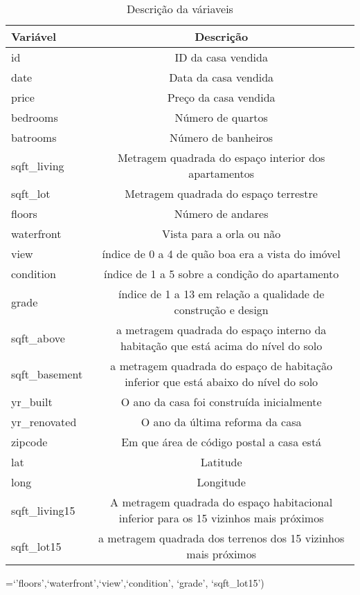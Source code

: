 \documentclass[
]{article}
\begin{document}
\begin{table}[H]
\caption{Descrição da váriaveis}\label{tab:tab0}
\centering
\begin{tabular}[t]{l|c}
\hline
Variável & Descrição\\
\hline
id & ID da casa vendida\\
\hline
date & Data da casa vendida\\
\hline
price & Preço da casa vendida\\
\hline
bedrooms & Número de quartos\\
\hline
batrooms & Número de banheiros \\
\hline
sqft_living & Metragem quadrada do espaço interior dos apartamentos\\
\hline
sqft_lot & Metragem quadrada do espaço terrestre\\
\hline
floors & Número de andares\\ 
\hline
waterfront &  Vista para a orla ou não\\
\hline
view  & índice de 0 a 4 de quão boa era a vista do imóvel\\
\hline
condition & índice de 1 a 5 sobre a condição do apartamento\\
  \hline
grade  & índice de 1 a 13 em relação a qualidade de construção e design\\
\hline
sqft_above  & a metragem quadrada do espaço interno da habitação que está acima do nível do solo\\
\hline
sqft_basement & a metragem quadrada do espaço de habitação inferior que está abaixo do nível do solo\\
\hline
yr_built  & O ano da casa foi construída inicialmente\\
\hline
yr_renovated  & O ano da última reforma da casa\\ 
\hline
zipcode & Em que área de código postal a casa está\\
\hline
lat & Latitude\\
\hline
long & Longitude\\
\hline
sqft_living15 & A metragem quadrada do espaço habitacional inferior para os 15 vizinhos mais próximos\\
\hline
sqft_lot15 & a metragem quadrada dos terrenos dos 15 vizinhos mais próximos\\
\hline

\end{tabular}
\end{table}

=`'floors',`waterfront',`view',`condition', `grade', `sqft\_lot15')
\end{document}
